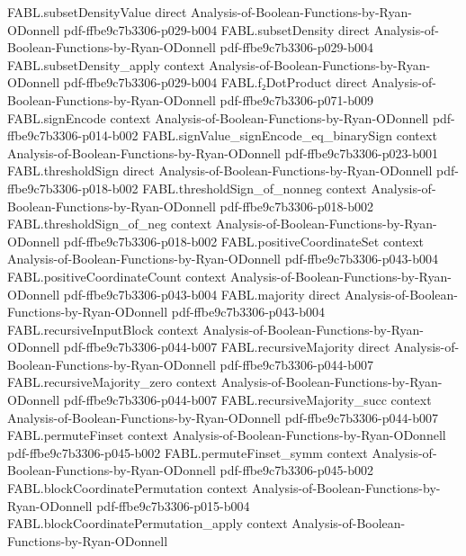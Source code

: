 \begin{theorem}
  {FABL.subsetDensityValue}
  {direct}
  {Analysis-of-Boolean-Functions-by-Ryan-ODonnell}
  {pdf-ffbe9c7b3306-p029-b004}
\proofstep
  {FABL.subsetDensity}
  {direct}
  {Analysis-of-Boolean-Functions-by-Ryan-ODonnell}
  {pdf-ffbe9c7b3306-p029-b004}
\proofstep
  {FABL.subsetDensity_apply}
  {context}
  {Analysis-of-Boolean-Functions-by-Ryan-ODonnell}
  {pdf-ffbe9c7b3306-p029-b004}
\proofstep
  {FABL.f₂DotProduct}
  {direct}
  {Analysis-of-Boolean-Functions-by-Ryan-ODonnell}
  {pdf-ffbe9c7b3306-p071-b009}
\proofstep
  {FABL.signEncode}
  {context}
  {Analysis-of-Boolean-Functions-by-Ryan-ODonnell}
  {pdf-ffbe9c7b3306-p014-b002}
\proofstep
  {FABL.signValue_signEncode_eq_binarySign}
  {context}
  {Analysis-of-Boolean-Functions-by-Ryan-ODonnell}
  {pdf-ffbe9c7b3306-p023-b001}
\proofstep
  {FABL.thresholdSign}
  {direct}
  {Analysis-of-Boolean-Functions-by-Ryan-ODonnell}
  {pdf-ffbe9c7b3306-p018-b002}
\proofstep
  {FABL.thresholdSign_of_nonneg}
  {context}
  {Analysis-of-Boolean-Functions-by-Ryan-ODonnell}
  {pdf-ffbe9c7b3306-p018-b002}
\proofstep
  {FABL.thresholdSign_of_neg}
  {context}
  {Analysis-of-Boolean-Functions-by-Ryan-ODonnell}
  {pdf-ffbe9c7b3306-p018-b002}
\proofstep
  {FABL.positiveCoordinateSet}
  {context}
  {Analysis-of-Boolean-Functions-by-Ryan-ODonnell}
  {pdf-ffbe9c7b3306-p043-b004}
\proofstep
  {FABL.positiveCoordinateCount}
  {context}
  {Analysis-of-Boolean-Functions-by-Ryan-ODonnell}
  {pdf-ffbe9c7b3306-p043-b004}
\proofstep
  {FABL.majority}
  {direct}
  {Analysis-of-Boolean-Functions-by-Ryan-ODonnell}
  {pdf-ffbe9c7b3306-p043-b004}
\proofstep
  {FABL.recursiveInputBlock}
  {context}
  {Analysis-of-Boolean-Functions-by-Ryan-ODonnell}
  {pdf-ffbe9c7b3306-p044-b007}
\proofstep
  {FABL.recursiveMajority}
  {direct}
  {Analysis-of-Boolean-Functions-by-Ryan-ODonnell}
  {pdf-ffbe9c7b3306-p044-b007}
\proofstep
  {FABL.recursiveMajority_zero}
  {context}
  {Analysis-of-Boolean-Functions-by-Ryan-ODonnell}
  {pdf-ffbe9c7b3306-p044-b007}
\proofstep
  {FABL.recursiveMajority_succ}
  {context}
  {Analysis-of-Boolean-Functions-by-Ryan-ODonnell}
  {pdf-ffbe9c7b3306-p044-b007}
\proofstep
  {FABL.permuteFinset}
  {context}
  {Analysis-of-Boolean-Functions-by-Ryan-ODonnell}
  {pdf-ffbe9c7b3306-p045-b002}
\proofstep
  {FABL.permuteFinset_symm}
  {context}
  {Analysis-of-Boolean-Functions-by-Ryan-ODonnell}
  {pdf-ffbe9c7b3306-p045-b002}
\proofstep
  {FABL.blockCoordinatePermutation}
  {context}
  {Analysis-of-Boolean-Functions-by-Ryan-ODonnell}
  {pdf-ffbe9c7b3306-p015-b004}
\proofstep
  {FABL.blockCoordinatePermutation_apply}
  {context}
  {Analysis-of-Boolean-Functions-by-Ryan-ODonnell}

\end{theorem}
